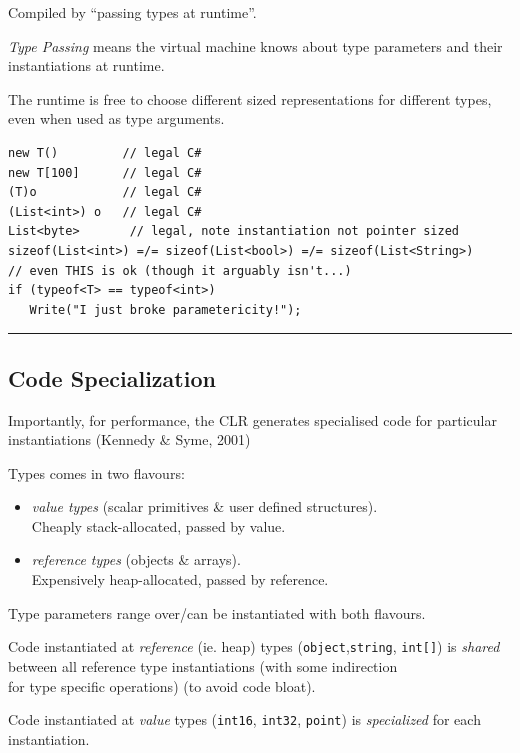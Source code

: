 Compiled by ``passing types at runtime''.

\emph{Type Passing} means the virtual machine knows about type
parameters and their instantiations at runtime.

The runtime is free to choose different sized representations for
different types, even when used as type arguments.

\begin{lstlisting}
new T()         // legal C#
new T[100]      // legal C#
(T)o            // legal C#
(List<int>) o   // legal C#
List<byte>       // legal, note instantiation not pointer sized 
sizeof(List<int>) =/= sizeof(List<bool>) =/= sizeof(List<String>)
// even THIS is ok (though it arguably isn't...)
if (typeof<T> == typeof<int>) 
   Write("I just broke parametericity!");  
\end{lstlisting}

\begin{center}\rule{0.5\linewidth}{\linethickness}\end{center}

\subsection{Code Specialization}\label{code-specialization}

Importantly, for performance, the CLR generates specialised code for
particular instantiations (Kennedy \& Syme, 2001)

Types comes in two flavours:

\begin{itemize}
\tightlist
\item
  \emph{value types} (scalar primitives \& user defined structures).\\
  Cheaply stack-allocated, passed by value.
\item
  \emph{reference types} (objects \& arrays).\\
  Expensively heap-allocated, passed by reference.
\end{itemize}

Type parameters range over/can be instantiated with both flavours.

Code instantiated at \emph{reference} (ie. heap) types
(\lstinline!object!,\lstinline!string!, \lstinline!int[]!) is
\emph{shared} between all reference type instantiations (with some
indirection\\
for type specific operations) (to avoid code bloat).

Code instantiated at \emph{value} types (\lstinline!int16!,
\lstinline!int32!, \lstinline!point!) is \emph{specialized} for each
instantiation.

